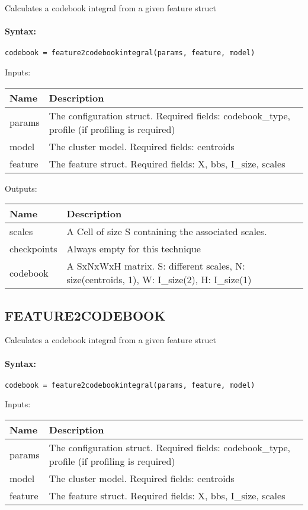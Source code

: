 Calculates a codebook integral from a given feature struct

\paragraph{Syntax:} \verb|codebook = feature2codebookintegral(params, feature, model)|

\bigskip
Inputs:

\begin{tabular}{|p{}|p{}|}
\hline
\textbf{Name} & \textbf{Description} \\
\hline \hline
params & The configuration struct. Required fields: codebook\_type, profile (if profiling is required)  \\ \hline
model & The cluster model. Required fields: centroids  \\ \hline
feature & The feature struct. Required fields: X, bbs, I\_size, scales  \\ \hline
\end{tabular}

\bigskip
Outputs:

\begin{tabular}{|p{}|p{}|}
\hline
\textbf{Name} & \textbf{Description} \\
\hline \hline
scales & A Cell of size S containing the associated scales.  \\ \hline
checkpoints & Always empty for this technique  \\ \hline
codebook & A SxNxWxH matrix. S: different scales, N: size(centroids, 1), W: I\_size(2), H: I\_size(1)  \\ \hline
\end{tabular}

\subsection{FEATURE2CODEBOOK}

Calculates a codebook integral from a given feature struct

\paragraph{Syntax:} \verb|codebook = feature2codebookintegral(params, feature, model)|

\bigskip
Inputs:

\begin{tabular}{|p{}|p{}|}
\hline
\textbf{Name} & \textbf{Description} \\
\hline \hline
params & The configuration struct. Required fields: codebook\_type, profile (if profiling is required)  \\ \hline
model & The cluster model. Required fields: centroids  \\ \hline
feature & The feature struct. Required fields: X, bbs, I\_size, scales  \\ \hline
\end{tabular}

